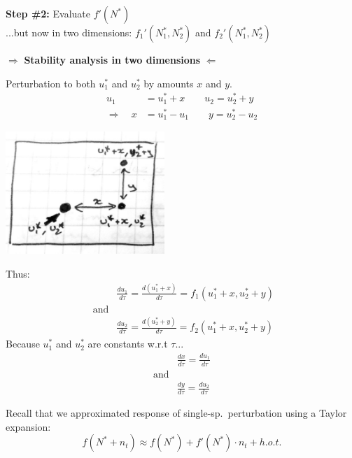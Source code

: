 \documentclass{article}
\newcommand{\ind}{\-\hspace{1cm}}
\begin{document}
\textbf{Step \#2:} Evaluate $f'(N^*)$ \\
\ind \ind \ind \ind ...but now in two dimensions:  $f_1'(N_1^*,N_2^*)$ and $f_2'(N_1^*,N_2^*)$\\

\begin{center}
	$\Rightarrow$ \textbf{Stability analysis in two dimensions} $\Leftarrow$\\
\end{center}

Perturbation to both $u_1^*$ and $u_2^*$ by amounts $x$ and $y$.
\begin{align*}
	u_1 & = u_1^* + x \quad \quad u_2  = u_2^* + y\\
	\Rightarrow \quad x & =u_1^* - u_1 \quad \quad y  = u_2^* - u_2
\end{align*}

\begin{center}
	\includegraphics[width=6cm]{figs/2Dperturb.pdf}
\end{center}

Thus:
\begin{align*}
	&\frac{du_1}{d\tau}=\frac{d (u_1^* + x)}{d\tau}=f_1(u_1^*+x,u_2^*+y)\\
	\text{ and} &\\
	&\frac{du_2}{d\tau}=\frac{d (u_2^* + y)}{d\tau}=f_2(u_1^*+x,u_2^*+y)	
\end{align*}
Because $u_1^*$ and $u_2^*$ are constants w.r.t $\tau$...
\begin{align*}
	&\frac{dx}{d\tau} = \frac{du_1}{d\tau}\\
	\text{and}&\\
	&\frac{dy}{d\tau}= \frac{du_2}{d\tau}
\end{align*}

Recall that we approximated response of single-sp.~perturbation using a Taylor expansion:\\
\begin{equation*}
	f(N^*+n_t)\approx f(N^*)+f'(N^*) \cdot n_t + h.o.t.
\end{equation*}
\end{document}

